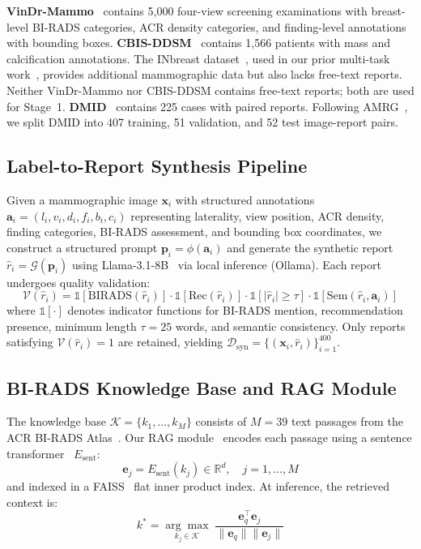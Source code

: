 \documentclass{wlscirep}
\begin{document}
\textbf{VinDr-Mammo}~\cite{nguyen2023vindr} contains 5,000 four-view screening examinations with breast-level BI-RADS categories, ACR density categories, and finding-level annotations with bounding boxes. \textbf{CBIS-DDSM}~\cite{lee2017curated} contains 1,566 patients with mass and calcification annotations. The INbreast dataset~\cite{moreira2012inbreast}, used in our prior multi-task work~\cite{esen2025multitask}, provides additional mammographic data but also lacks free-text reports. Neither VinDr-Mammo nor CBIS-DDSM contains free-text reports; both are used for Stage~1. \textbf{DMID}~\cite{oza2024} contains 225 cases with paired reports. Following AMRG~\cite{sung2025}, we split DMID into 407 training, 51 validation, and 52 test image-report pairs.

\subsection*{Label-to-Report Synthesis Pipeline}

Given a mammographic image $\mathbf{x}_i$ with structured annotations $\mathbf{a}_i = (l_i, v_i, d_i, f_i, b_i, c_i)$ representing laterality, view position, ACR density, finding categories, BI-RADS assessment, and bounding box coordinates, we construct a structured prompt $\mathbf{p}_i = \phi(\mathbf{a}_i)$ and generate the synthetic report $\hat{r}_i = \mathcal{G}(\mathbf{p}_i)$ using Llama-3.1-8B~\cite{dubey2024llama3} via local inference (Ollama). Each report undergoes quality validation:
\begin{equation}
\mathcal{V}(\hat{r}_i) = \mathbb{1}[\text{BIRADS}(\hat{r}_i)] \cdot \mathbb{1}[\text{Rec}(\hat{r}_i)] \cdot \mathbb{1}[|\hat{r}_i| \geq \tau] \cdot \mathbb{1}[\text{Sem}(\hat{r}_i, \mathbf{a}_i)]
\label{eq:validation}
\end{equation}
where $\mathbb{1}[\cdot]$ denotes indicator functions for BI-RADS mention, recommendation presence, minimum length $\tau=25$ words, and semantic consistency. Only reports satisfying $\mathcal{V}(\hat{r}_i)=1$ are retained, yielding $\mathcal{D}_{\text{syn}} = \{(\mathbf{x}_i, \hat{r}_i)\}_{i=1}^{400}$.

\subsection*{BI-RADS Knowledge Base and RAG Module}

The knowledge base $\mathcal{K} = \{k_1, \ldots, k_M\}$ consists of $M=39$ text passages from the ACR BI-RADS Atlas~\cite{birads2013}. Our RAG module~\cite{lewis2020rag} encodes each passage using a sentence transformer~\cite{reimers2019sentencebert} $E_{\text{sent}}$:
\begin{equation}
\mathbf{e}_j = E_{\text{sent}}(k_j) \in \mathbb{R}^{d}, \quad j = 1, \ldots, M
\end{equation}
and indexed in a FAISS~\cite{johnson2020faiss} flat inner product index. At inference, the retrieved context is:
\begin{equation}
k^* = \underset{k_j \in \mathcal{K}}{\arg\max} \; \frac{\mathbf{e}_q^\top \mathbf{e}_j}{\|\mathbf{e}_q\| \|\mathbf{e}_j\|}
\end{equation}
\end{document}
